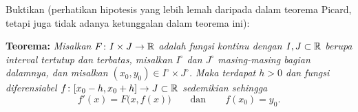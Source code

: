 \begin{exercise} \label{exercise:peanoexistence}
Buktikan \emph{} (perhatikan hipotesis yang
lebih lemah daripada dalam teorema Picard, tetapi juga tidak adanya
ketunggalan dalam teorema ini):

\textbf{Teorema:} \emph{Misalkan $F \colon I \times J \to {\mathbb{R}}$ adalah
fungsi kontinu dengan
$I, J \subset {\mathbb{R}}$ berupa interval tertutup dan terbatas,
misalkan $I^\circ$ dan $J^\circ$ masing-masing bagian dalamnya,
dan
misalkan $(x_0,y_0) \in I^\circ \times J^\circ$.
Maka terdapat $h > 0$ dan fungsi diferensiabel
$f \colon [x_0 - h, x_0 + h] \to J \subset {\mathbb{R}}$ sedemikian sehingga}
\begin{equation*}
f'(x) = F\bigl(x,f(x)\bigr) \qquad \text{dan} \qquad f(x_0) = y_0.
\end{equation*}


\end{exercise}
